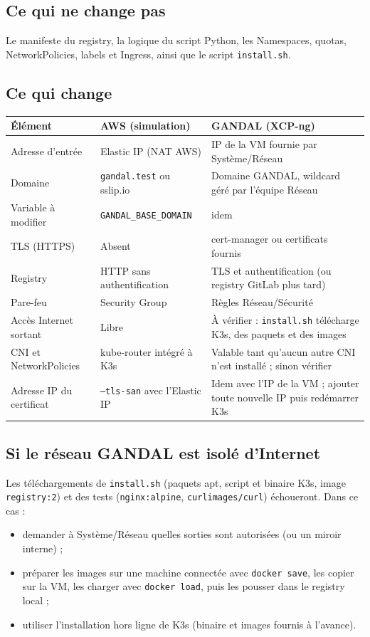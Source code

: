 \documentclass[12pt,a4paper]{article}
\begin{document}
\subsection{Ce qui ne change pas}
Le manifeste du registry, la logique du script Python, les Namespaces, quotas, NetworkPolicies, labels et Ingress, ainsi que le script \texttt{install.sh}.

\subsection{Ce qui change}
\begin{center}
\begin{tabular}{p{4cm}p{4.4cm}p{5.2cm}}
\toprule
\textbf{Élément} & \textbf{AWS (simulation)} & \textbf{GANDAL (XCP-ng)} \\
\midrule
Adresse d'entrée & Elastic IP (NAT AWS) & IP de la VM fournie par Système/Réseau \\
Domaine & \nolinkurl{gandal.test} ou sslip.io & Domaine GANDAL, wildcard géré par l'équipe Réseau \\
Variable à modifier & \nolinkurl{GANDAL_BASE_DOMAIN} & idem \\
TLS (HTTPS) & Absent & cert-manager ou certificats fournis \\
Registry & HTTP sans authentification & TLS et authentification (ou registry GitLab plus tard) \\
Pare-feu & Security Group & Règles Réseau/Sécurité \\
Accès Internet sortant & Libre & À vérifier : \texttt{install.sh} télécharge K3s, des paquets et des images \\
CNI et NetworkPolicies & kube-router intégré à K3s & Valable tant qu'aucun autre CNI n'est installé ; sinon vérifier \\
Adresse IP du certificat & \texttt{--tls-san} avec l'Elastic IP & Idem avec l'IP de la VM ; ajouter toute nouvelle IP puis redémarrer K3s \\
\bottomrule
\end{tabular}
\end{center}

\subsection{Si le réseau GANDAL est isolé d'Internet}
Les téléchargements de \texttt{install.sh} (paquets apt, script et binaire K3s, image \texttt{registry:2}) et des tests (\texttt{nginx:alpine}, \texttt{curlimages/curl}) échoueront. Dans ce cas :
\begin{itemize}
    \item demander à Système/Réseau quelles sorties sont autorisées (ou un miroir interne) ;
    \item préparer les images sur une machine connectée avec \texttt{docker save}, les copier sur la VM, les charger avec \texttt{docker load}, puis les pousser dans le registry local ;
    \item utiliser l'installation hors ligne de K3s (binaire et images fournis à l'avance).
\end{itemize}
\end{document}
